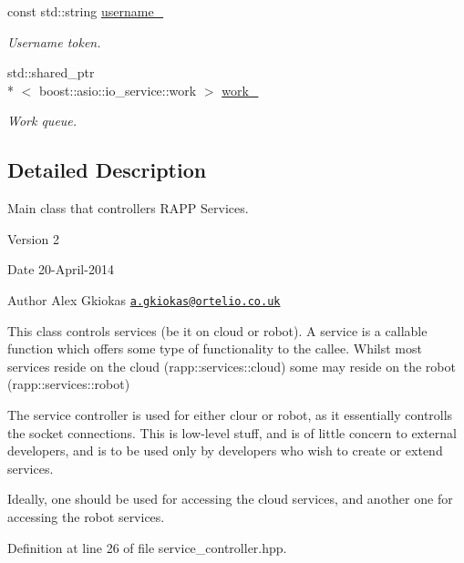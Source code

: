 \begin{DoxyCompactItemize}
const std\-::string \hyperlink{classrapp_1_1services_1_1service__controller_ae2ad65d02bb9323d281c898502eec110}{username\-\_\-}
\begin{DoxyCompactList}\small\item\em Username token. \end{DoxyCompactList}\item 
std\-::shared\-\_\-ptr\\*
$<$ boost\-::asio\-::io\-\_\-service\-::work $>$ \hyperlink{classrapp_1_1services_1_1service__controller_ad328559c88362e93794640dc56b1739e}{work\-\_\-}
\begin{DoxyCompactList}\small\item\em Work queue. \end{DoxyCompactList}\end{DoxyCompactItemize}


\subsection{Detailed Description}
Main class that controllers R\-A\-P\-P Services. 

\begin{DoxyVersion}{Version}
2 
\end{DoxyVersion}
\begin{DoxyDate}{Date}
20-\/\-April-\/2014 
\end{DoxyDate}
\begin{DoxyAuthor}{Author}
Alex Gkiokas \href{mailto:a.gkiokas@ortelio.co.uk}{\tt a.\-gkiokas@ortelio.\-co.\-uk}
\end{DoxyAuthor}
This class controls services (be it on cloud or robot). A service is a callable function which offers some type of functionality to the callee. Whilst most services reside on the cloud (rapp\-::services\-::cloud) some may reside on the robot (rapp\-::services\-::robot)

The service controller is used for either clour or robot, as it essentially controlls the socket connections. This is low-\/level stuff, and is of little concern to external developers, and is to be used only by developers who wish to create or extend services.

Ideally, one should be used for accessing the cloud services, and another one for accessing the robot services. 

Definition at line 26 of file service\-\_\-controller.\-hpp.




